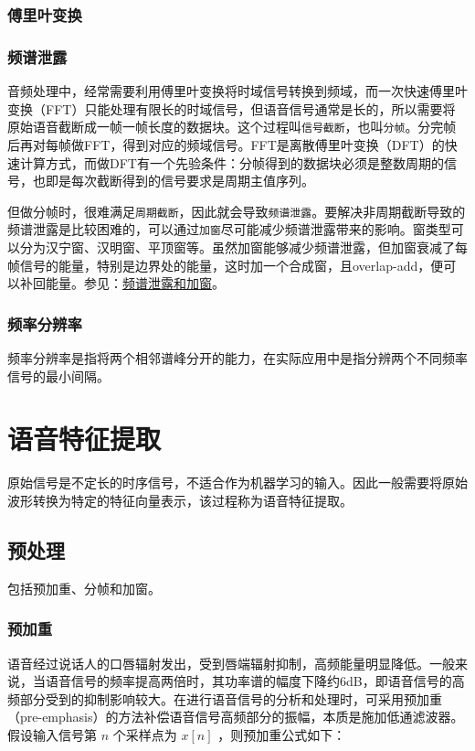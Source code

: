 \documentclass[cn,10pt,math=newtx,citestyle=gb7714-2015,bibstyle=gb7714-2015]{elegantbook}
\begin{document}
\subsection{傅里叶变换}

\subsection{频谱泄露}

音频处理中，经常需要利用傅里叶变换将时域信号转换到频域，而一次快速傅里叶变换（FFT）只能处理有限长的时域信号，但语音信号通常是长的，所以需要将原始语音截断成一帧一帧长度的数据块。这个过程叫\lstinline{信号截断}，也叫\lstinline{分帧}。分完帧后再对每帧做FFT，得到对应的频域信号。FFT是离散傅里叶变换（DFT）的快速计算方式，而做DFT有一个先验条件：分帧得到的数据块必须是整数周期的信号，也即是每次截断得到的信号要求是周期主值序列。

但做分帧时，很难满足\lstinline{周期截断}，因此就会导致\lstinline{频谱泄露}。要解决非周期截断导致的频谱泄露是比较困难的，可以通过\lstinline{加窗}尽可能减少频谱泄露带来的影响。窗类型可以分为汉宁窗、汉明窗、平顶窗等。虽然加窗能够减少频谱泄露，但加窗衰减了每帧信号的能量，特别是边界处的能量，这时加一个合成窗，且overlap-add，便可以补回能量。参见：\href{https://zhuanlan.zhihu.com/p/339692933}{频谱泄露和加窗}。

\subsection{频率分辨率}
频率分辨率是指将两个相邻谱峰分开的能力，在实际应用中是指分辨两个不同频率信号的最小间隔。


\chapter{语音特征提取}
原始信号是不定长的时序信号，不适合作为机器学习的输入。因此一般需要将原始波形转换为特定的特征向量表示，该过程称为语音特征提取。

\section{预处理}
包括预加重、分帧和加窗。

\subsection{预加重}
语音经过说话人的口唇辐射发出，受到唇端辐射抑制，高频能量明显降低。一般来说，当语音信号的频率提高两倍时，其功率谱的幅度下降约6dB，即语音信号的高频部分受到的抑制影响较大。在进行语音信号的分析和处理时，可采用预加重（pre-emphasis）的方法补偿语音信号高频部分的振幅，本质是施加低通滤波器。假设输入信号第 $n$ 个采样点为 $x[n]$ ，则预加重公式如下：
\end{document}
